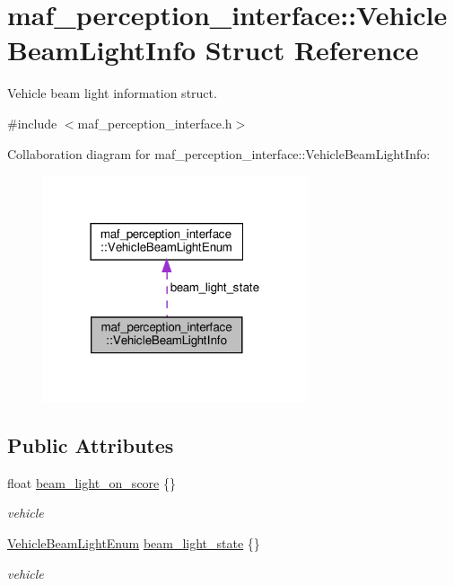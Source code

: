 \hypertarget{structmaf__perception__interface_1_1VehicleBeamLightInfo}{}\section{maf\+\_\+perception\+\_\+interface\+:\+:Vehicle\+Beam\+Light\+Info Struct Reference}
\label{structmaf__perception__interface_1_1VehicleBeamLightInfo}


Vehicle beam light information struct.  




{\ttfamily \#include $<$maf\+\_\+perception\+\_\+interface.\+h$>$}



Collaboration diagram for maf\+\_\+perception\+\_\+interface\+:\+:Vehicle\+Beam\+Light\+Info\+:\nopagebreak
\begin{figure}[H]
\begin{center}
\leavevmode
\includegraphics[width=222pt]{structmaf__perception__interface_1_1VehicleBeamLightInfo__coll__graph}
\end{center}
\end{figure}
\subsection*{Public Attributes}
\begin{DoxyCompactItemize}
\item 
float \hyperlink{structmaf__perception__interface_1_1VehicleBeamLightInfo_a41e7434b71478faf81c3f7547aa1d2b1}{beam\+\_\+light\+\_\+on\+\_\+score} \{\}
\begin{DoxyCompactList}\small\item\em vehicle \end{DoxyCompactList}\item 
\hyperlink{structmaf__perception__interface_1_1VehicleBeamLightEnum}{Vehicle\+Beam\+Light\+Enum} \hyperlink{structmaf__perception__interface_1_1VehicleBeamLightInfo_aad4877e845fc61f76897c758efe024a4}{beam\+\_\+light\+\_\+state} \{\}
\begin{DoxyCompactList}\small\item\em vehicle \end{DoxyCompactList}\end{DoxyCompactItemize}


